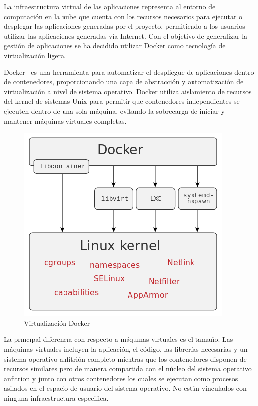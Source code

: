 \documentclass[a4paper,11pt]{book}
\begin{document}
La infraestructura virtual de las aplicaciones  representa al entorno de computación en la nube que cuenta con los recursos necesarios para ejecutar o desplegar las aplicaciones generadas por el proyecto, permitiendo a los usuarios utilizar las aplicaciones generadas vía Internet.
Con el objetivo de generalizar la gestión de aplicaciones  se ha decidido utilizar Docker como tecnología de virtualización ligera.

Docker~\cite{dk} es una herramienta para automatizar el despliegue de aplicaciones dentro de contenedores, proporcionando una capa de abstracción y automatización de virtualización a nivel de sistema operativo. Docker utiliza aislamiento de recursos del kernel de sistemas Unix  para permitir que contenedores independientes se ejecuten dentro de una sola máquina, evitando la sobrecarga de iniciar y mantener máquinas virtuales completas.

\begin{figure}[H]
\centering
\includegraphics[scale=0.35]{imagenes/docker.png}
\caption{ Virtualización Docker~\cite{dkw}}
\end{figure}

La principal diferencia con respecto a máquinas virtuales es el tamaño. Las máquinas virtuales incluyen la aplicación, el código, las librerías necesarias y un sistema operativo anfitrión completo mientras que los contenedores disponen de recursos similares pero de manera compartida con el núcleo  del sistema operativo anfitrion y junto con otros contenedores los cuales se ejecutan  como procesos asilados en el espacio de usuario del sistema operativo. No están vinculados con ninguna infraestructura especifica.
\end{document}
